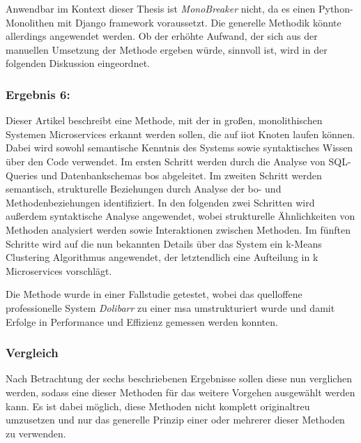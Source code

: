 Anwendbar im Kontext dieser Thesis ist \emph{MonoBreaker} nicht, da es einen Python-Monolithen mit Django framework voraussetzt.
Die generelle Methodik könnte allerdings angewendet werden.
Ob der erhöhte Aufwand, der sich aus der manuellen Umsetzung der Methode ergeben würde, sinnvoll ist, wird in der folgenden Diskussion eingeordnet.


\subsubsection{Ergebnis 6:  \cite{arh-result-important-filter-4}}

Dieser Artikel beschreibt eine Methode, mit der in großen, monolithischen Systemen Microservices erkannt werden sollen, die auf \gls{iiot} Knoten laufen können.
Dabei wird sowohl semantische Kenntnis des Systems sowie syntaktisches Wissen über den Code verwendet.
Im ersten Schritt werden durch die Analyse von SQL-Queries und Datenbankschemas \glspl{bo} abgeleitet.
Im zweiten Schritt werden semantisch, strukturelle Beziehungen durch Analyse der \gls{bo}- und Methodenbeziehungen identifiziert.
In den folgenden zwei Schritten wird außerdem syntaktische Analyse angewendet, wobei strukturelle Ähnlichkeiten von Methoden analysiert werden sowie Interaktionen zwischen Methoden.
Im fünften Schritte wird auf die nun bekannten Details über das System ein k-Means Clustering Algorithmus angewendet, der letztendlich eine Aufteilung in k Microservices vorschlägt.

Die Methode wurde in einer Fallstudie getestet, wobei das quelloffene professionelle System \emph{Dolibarr} zu einer \gls{msa} umstrukturiert wurde und damit Erfolge in Performance und Effizienz gemessen werden konnten.

\subsubsection{Vergleich}

Nach Betrachtung der sechs beschriebenen Ergebnisse sollen diese nun verglichen werden, sodass eine dieser Methoden für das weitere Vorgehen ausgewählt werden kann.
Es ist dabei möglich, diese Methoden nicht komplett originaltreu umzusetzen und nur das generelle Prinzip einer oder mehrerer dieser Methoden zu verwenden.


